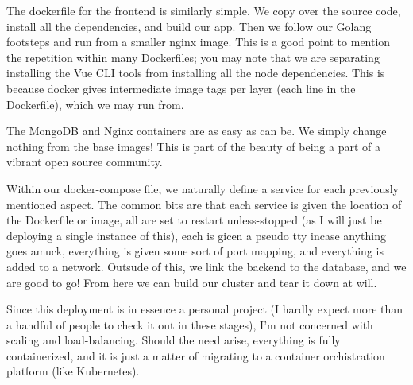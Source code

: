 \documentclass[11pt, twoside, reqno]{book}
\begin{document}
\label{Vue Frontend Dockerfile}

The dockerfile for the frontend is similarly simple. We copy over the source code, install all the dependencies, and build our app. Then we follow our Golang footsteps and run from a smaller nginx image. This is a good point to mention the repetition within many Dockerfiles; you may note that we are separating installing the Vue CLI tools from installing all the node dependencies. This is because docker gives intermediate image tags per layer (each line in the Dockerfile), which we may run from.

\label{Mongo and Nginx}

The MongoDB and Nginx containers are as easy as can be. We simply change nothing from the base images! This is part of the beauty of being a part of a vibrant open source community.

\label{The Composition}

Within our docker-compose file, we naturally define a service for each previously mentioned aspect. The common bits are that each service is given the location of the Dockerfile or image, all are set to restart unless-stopped (as I will just be deploying a single instance of this), each is gicen a pseudo tty incase anything goes amuck, everything is given some sort of port mapping, and everything is added to a network. Outsude of this, we link the backend to the database, and we are good to go! From here we can build our cluster and tear it down at will.

Since this deployment is in essence a personal project (I hardly expect more than a handful of people to check it out in these stages), I'm not concerned with scaling and load-balancing. Should the need arise, everything is fully containerized, and it is just a matter of migrating to a container orchistration platform (like Kubernetes).
\end{document}

